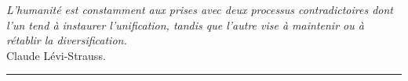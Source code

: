 \thispagestyle{empty}
\begin{flushright}
    \emph{L'humanité est constamment aux prises avec deux processus contradictoires dont l'un tend à instaurer l'unification, tandis que l'autre vise à maintenir ou à rétablir la diversification.}\\
    Claude Lévi-Strauss.\\
    
    \rule{5cm}{1pt}
    
\end{flushright}
